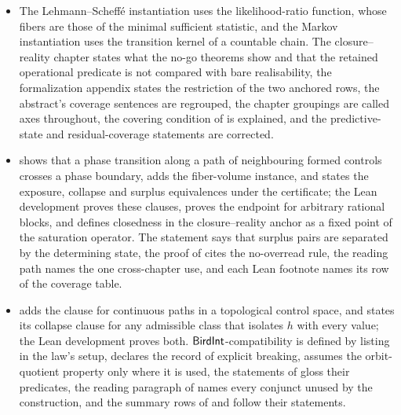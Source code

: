 \begin{itemize}
   states horizon-boundedness and defines horizon
  sufficiency. The inherited-rules paragraph counts the laws that use them,
  the source of  is called the CSL paper, access is stated for any
  observation signature, the Access chapter points new readers to the
  Transport chapter, and three summary-table rows state what their theorems
  prove.
\item The Lehmann--Scheff\'e instantiation uses the likelihood-ratio function,
  whose fibers are those of the minimal sufficient statistic, and the Markov
  instantiation uses the transition kernel of a countable chain. The
  closure--reality chapter states what the no-go theorems show and that
  the retained operational predicate is not compared with bare realisability, the
  formalization appendix states the restriction of the two anchored rows,
  the abstract's coverage sentences are regrouped, the chapter groupings are
  called axes throughout, the covering condition of  is
  explained, and the predictive-state and residual-coverage statements are
  corrected.
\item {} shows that a phase transition along a path of
  neighbouring formed controls crosses a phase boundary,  adds
  the fiber-volume instance, and  states the exposure,
  collapse and surplus equivalences under the certificate; the Lean
  development proves these clauses, proves the  endpoint for
  arbitrary rational blocks, and defines closedness in the closure--reality
  anchor as a fixed point of the saturation operator. The 
  statement says that surplus pairs are separated by the determining state,
  the proof of  cites the no-overread rule, the reading path
  names the one cross-chapter use, and each Lean footnote names its row of
  the coverage table.
\item {} adds the clause for continuous paths in a topological
  control space, and  states its collapse clause for any
  admissible class that isolates \(h\) with every value; the Lean
  development proves both. \(\mathsf{BirdInt}\)-compatibility is defined by listing in
  the law's setup,  declares the record of explicit breaking,
   assumes the orbit-quotient property only where it is used,
  the statements of  gloss their predicates,
  the reading paragraph of  names every conjunct unused by the
  construction, and the summary rows of  and  follow
  their statements.

\end{itemize}
